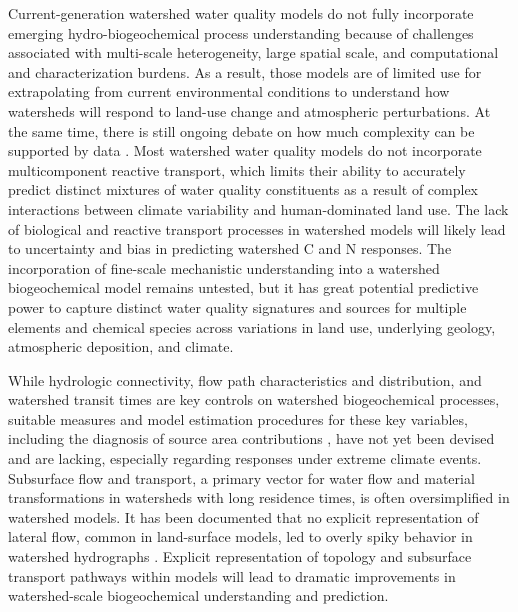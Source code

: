 \documentclass[preprint,review, 12pt]{elsarticle}
\begin{document}
Current-generation watershed water quality models do not fully incorporate emerging hydro-biogeochemical process understanding because of challenges associated with multi-scale heterogeneity, large spatial scale, and computational and characterization burdens. As a result, those models are of limited use for extrapolating from current environmental conditions to understand how watersheds will respond to land-use change and atmospheric perturbations. At the same time, there is still ongoing debate on how much complexity can be supported by data \citep{Jackson-Blakea}. Most watershed water quality models \citep{Kaushal2018f, Vidon2018} do not incorporate multicomponent reactive transport, which limits their ability to accurately predict distinct mixtures of water quality constituents \citep{Kaushal2018f} as a result of complex interactions between climate variability and human-dominated land use. The lack of biological and reactive transport processes in watershed models will likely lead to uncertainty and bias in predicting watershed C and N responses. The incorporation of fine-scale mechanistic understanding into a watershed biogeochemical model remains untested, but it has great potential predictive power to capture distinct water quality signatures and sources for multiple elements and chemical species across variations in land use, underlying geology, atmospheric deposition, and climate. 
    
While hydrologic connectivity, flow path characteristics and distribution, and watershed transit times are key controls on watershed biogeochemical processes, suitable measures and model estimation procedures for these key variables, including the diagnosis of source area contributions \citep{Hewlett1967}, have not yet been devised and are lacking, especially regarding responses under extreme climate events. Subsurface flow and transport, a primary vector for water flow and material transformations in watersheds with long residence times, is often oversimplified in watershed models. It has been documented that no explicit representation of lateral flow, common in land-surface models, led to overly spiky behavior in watershed hydrographs \citep{Clark2015d}. Explicit representation of topology and subsurface transport pathways within models will lead to dramatic improvements in watershed-scale biogeochemical understanding and prediction.
    


\end{document}
